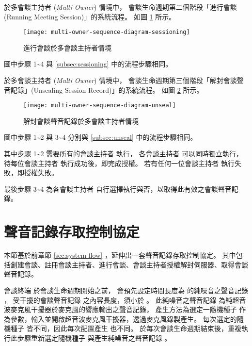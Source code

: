     於多會談主持者 ({\it Multi Owner}) 情境中，
會談生命週期第二個階段「進行會談 (Running Meeting Session)」的系統流程。
如圖 \ref{fig:m-o-sessioning} 所示。

\begin{figure}[H]
    \centering
    \texttt{[image: multi-owner-sequence-diagram-sessioning]}
    \caption{進行會談於多會談主持者情境}\label{fig:m-o-sessioning}
\end{figure}

    圖中步驟 1\textasciitilde4 與
 \ref{subsec:sessioning}  中的流程步驟相同。

    於多會談主持者 ({\it Multi Owner}) 情境中，
會談生命週期第三個階段「解封會談聲音記錄」(Unsealing Session Record)」的系統流程。
如圖 \ref{fig:m-o-unseal} 所示。

\begin{figure}[H]
    \centering
    \texttt{[image: multi-owner-sequence-diagram-unseal]}
    \caption{解封會談聲音記錄於多會談主持者情境}\label{fig:m-o-unseal}
\end{figure}

    圖中步驟 1\textasciitilde2 與 3\textasciitilde4
分別與 \ref{subsec:unseal}  中的流程步驟相同。

    其中步驟 1\textasciitilde2 需要所有的會談主持者 \DEFownerAll 執行，
各會談主持者 \DEFowner 可以同時獨立執行，待每位會談主持者 \DEFowner 執行成功後，即完成授權。
若有任何一位會談主持者 \DEFowner 執行失敗，即授權失敗。

    最後步驟 3\textasciitilde4 為各會談主持者 \DEFowner 自行選擇執行與否，以取得此有效之會談聲音記錄。


\section{聲音記錄存取控制協定}\label{sec:protocol}

    本節基於前章節 \ref{sec:system-flow} ，延伸出一套聲音記錄存取控制協定。
其中包括創建會談、註冊會談主持者、進行會談、會談主持者授權解封伺服器、取得會談聲音記錄。

    會談終端 \DEFmeetingbox 於會談生命週期開始之前，
會預先設定時間長度為 \DEFtimeMAX 的純噪音之聲音記錄 \DEFrecN，
受干擾的會談聲音記錄 \DEFrecJ 之內容長度，須小於 \DEFtimeMAX。
此純噪音之聲音記錄 \DEFrecN 為純超音波麥克風干擾器於麥克風的響應輸出之聲音記錄，
產生方法為選定一隨機種子 \DEFseed 作為參數，輸入並開啟超音波麥克風干擾器，透過麥克風錄製產生。
每次選定的隨機種子 \DEFseed 皆不同，因此每次配置產生 \DEFrecN 也不同。
於每次會談生命週期結束後，重複執行此步驟重新選定隨機種子 \DEFseed 與產生純噪音之聲音記錄 \DEFrecN。


